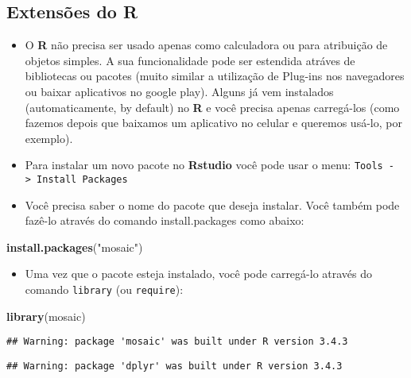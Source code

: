 \documentclass[]{article}
\newenvironment{Shaded}{\begin{snugshade}}{\end{snugshade}}
\newcommand{\KeywordTok}[1]{\textcolor[rgb]{0.13,0.29,0.53}{\textbf{#1}}}
\newcommand{\StringTok}[1]{\textcolor[rgb]{0.31,0.60,0.02}{#1}}
\newcommand{\NormalTok}[1]{#1}
\providecommand{\tightlist}{%
  \setlength{\itemsep}{0pt}\setlength{\parskip}{0pt}}
\begin{document}
\subsection{\texorpdfstring{Extensões do
\textbf{R}}{Extensões do R}}\label{extensoes-do-r}

\begin{itemize}
\tightlist
\item
  O \textbf{R} não precisa ser usado apenas como calculadora ou para
  atribuição de objetos simples. A sua funcionalidade pode ser estendida
  atráves de bibliotecas ou pacotes (muito similar a utilização de
  Plug-ins nos navegadores ou baixar aplicativos no google play). Alguns
  já vem instalados (automaticamente, by default) no \textbf{R} e você
  precisa apenas carregá-los (como fazemos depois que baixamos um
  aplicativo no celular e queremos usá-lo, por exemplo).
\item
  Para instalar um novo pacote no \textbf{Rstudio} você pode usar o
  menu: \texttt{Tools\ -\textgreater{}\ Install\ Packages}
\item
  Você precisa saber o nome do pacote que deseja instalar. Você também
  pode fazê-lo através do comando install.packages como abaixo:
\end{itemize}

\begin{Shaded}
\begin{Highlighting}[]
\KeywordTok{install.packages}\NormalTok{(}\StringTok{"mosaic"}\NormalTok{)}
\end{Highlighting}
\end{Shaded}

\begin{itemize}
\tightlist
\item
  Uma vez que o pacote esteja instalado, você pode carregá-lo através do
  comando \texttt{library} (ou \texttt{require}):
\end{itemize}

\begin{Shaded}
\begin{Highlighting}[]
\KeywordTok{library}\NormalTok{(mosaic)}
\end{Highlighting}
\end{Shaded}

\begin{verbatim}
## Warning: package 'mosaic' was built under R version 3.4.3
\end{verbatim}

\begin{verbatim}
## Warning: package 'dplyr' was built under R version 3.4.3
\end{verbatim}
\end{document}
